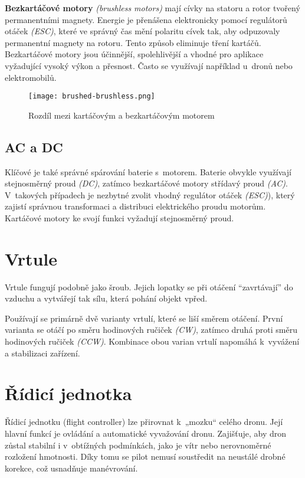 \documentclass[12pt]{report}
\begin{document}
\textbf{Bezkartáčové motory} \textit{(brushless motors)} mají cívky na statoru a rotor tvořený permanentními magnety. Energie je přenášena elektronicky pomocí regulátorů otáček \textit{(ESC)}, které ve správný čas mění polaritu cívek tak, aby odpuzovaly permanentní magnety na rotoru. Tento způsob eliminuje tření kartáčů. Bezkartáčové motory jsou účinnější, spolehlivější a vhodné pro aplikace vyžadující vysoký výkon a přesnost. Často se využívají například u~dronů nebo elektromobilů.

\begin{figure}[H]
	\centering
	\texttt{[image: brushed-brushless.png]}
	\caption{Rozdíl mezi kartáčovým a bezkartáčovým motorem \cite{rozum}}
	\label{fig:brushed-brushless.png}
  \end{figure}

\subsection[AC a DC]{AC a DC}
Klíčové je také správné spárování baterie s~motorem. Baterie obvykle využívají stejnosměrný proud \textit{(DC)}, zatímco bezkartáčové motory střídavý proud \textit{(AC)}. V~takových případech je nezbytné zvolit vhodný regulátor otáček \textit{(ESC)}), který zajistí správnou transformaci a distribuci elektrického proudu motorům. Kartáčové motory ke svojí funkci vyžadují stejnosměrný proud. \cite{mainbook} \cite{dojo} \cite{ultimateguide} \cite{motors}

\section[Vrtule]{Vrtule}

Vrtule fungují podobně jako šroub. Jejich lopatky se při otáčení “zavrtávají” do vzduchu a vytvářejí tak sílu, která pohání objekt vpřed.

Používají se primárně dvě varianty vrtulí, které se liší směrem otáčení. První varianta se otáčí po směru hodinových ručiček \textit{(CW)}, zatímco druhá proti směru hodinových ručiček \textit{(CCW)}. Kombinace obou varian vrtulí napomáhá k~vyvážení a stabilizaci zařízení. \cite{mainbook} \cite{dojo}

\section[Řídicí jednotka]{Řídicí jednotka}

Řídicí jednotku (flight controller) lze přirovnat k~„mozku“ celého dronu. Její hlavní funkcí je ovládání a automatické vyvažování dronu. Zajišťuje, aby dron zůstal stabilní i v~obtížných podmínkách, jako je vítr nebo nerovnoměrné rozložení hmotnosti. Díky tomu se pilot nemusí soustředit na neustálé drobné korekce, což usnadňuje manévrování.
\end{document}
